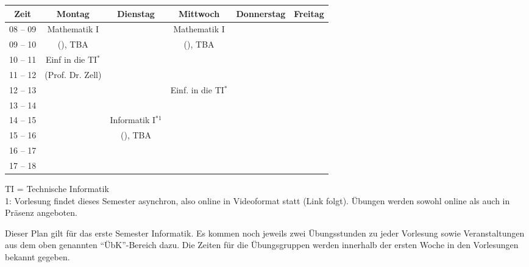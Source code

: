 \begin{minipage}{\textwidth}
    \footnotesize
\begin{center}
	\begin{tabular}{|c|c|c|c|c|c|}
	\hline
	 Zeit     &    Montag                    & Dienstag          & Mittwoch          	& Donnerstag & Freitag \\ \hline\hline
	 08 -- 09 &    Mathematik I              &                   & Mathematik I      	&  &  \\ \cline{1-1} \cline{3-3} \cline{5-6} 
	 09 -- 10 &    (\Matheprof), TBA         &                   & (\Matheprof), TBA 	&  &  \\ \hline
	 10 -- 11 &    Einf in die TI$^*$        &                   &                   	&  &  \\ \cline{1-1} \cline{3-6} 
	 11 -- 12 &    (Prof. Dr. Zell)          &                   &                   	&  &  \\ \hline
	 12 -- 13 &                              &                   & Einf. in die TI$^*$    	&  &  \\ \hline
	 13 -- 14 &                              &                   &                   	&  &  \\ \hline
	 14 -- 15 &                              & Informatik I$^{*1}$  &                   	&  &  \\ \cline{1-2} \cline{4-6} 
	 15 -- 16 &                              & (\Infoprof), TBA  &                   	&  &  \\ \hline
	 16 -- 17 &                              &                   &                   	&  &  \\ \hline
	 17 -- 18 &                              &                   &                   	&  &  \\ \hline
	\end{tabular}
	
\scriptsize TI = Technische Informatik\\
1: Vorlesung findet dieses Semester asynchron, also online in Videoformat statt (Link folgt). Übungen werden sowohl online als auch in Präsenz angeboten.\\

\end{center}
\end{minipage}
Dieser Plan gilt für das erste Semester Informatik. Es kommen noch jeweils zwei Übungsstunden zu jeder Vorlesung 
sowie Veranstaltungen aus dem oben genannten "`\"UbK"'-Bereich dazu.
Die Zeiten für die Übungsgruppen werden innerhalb der ersten Woche in den Vorlesungen bekannt gegeben.
